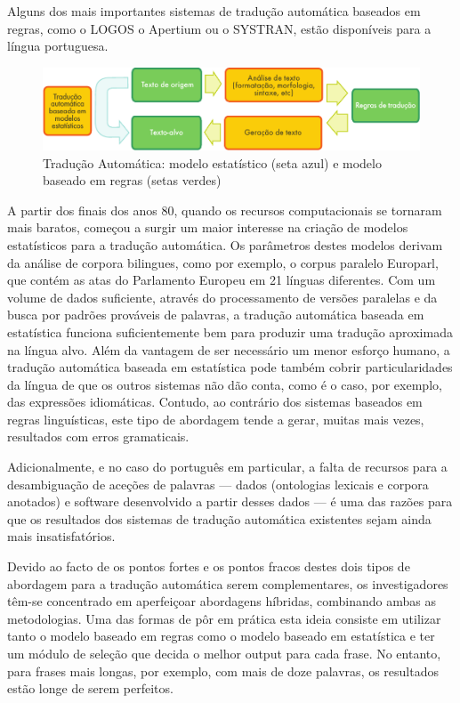 \begin{multicols}{2}
Alguns dos mais importantes sistemas de tradução automática baseados em regras, como o LOGOS o Apertium ou o SYSTRAN, estão disponíveis para a língua portuguesa.

\begin{figure}[htb]
  \center
  \includegraphics[width=\textwidth]{../_media/portuguese/machine_translation}
  \caption{Tradução Automática: modelo estatístico (seta azul) e modelo baseado em regras (setas verdes)}
  \label{fig:mtarch_de}
\end{figure}

A partir dos finais dos anos 80, quando os recursos computacionais se tornaram mais baratos, 
começou a surgir um maior interesse na criação de modelos estatísticos para a tradução automática. 
Os parâmetros destes modelos derivam da análise de corpora bilingues, como por exemplo, o corpus paralelo Europarl, 
que contém as atas do Parlamento Europeu em 21 línguas diferentes. 
Com um volume de dados suficiente, através do processamento de versões paralelas 
e da busca por padrões prováveis de palavras, a tradução automática baseada em estatística funciona suficientemente bem 
para produzir uma tradução aproximada na língua alvo. 
Além da vantagem de ser necessário um menor esforço humano, a tradução automática baseada 
em estatística pode também cobrir particularidades da língua de que os outros sistemas não dão conta, 
como é o caso, por exemplo, das expressões idiomáticas.
Contudo, ao contrário dos sistemas baseados em regras linguísticas, este tipo de abordagem 
tende a gerar, muitas mais vezes, resultados com erros gramaticais.

Adicionalmente, e no caso do português em particular, a falta de recursos 
para a desambiguação de aceções de palavras --- dados (ontologias lexicais e corpora anotados) e software desenvolvido a partir desses dados --- é uma das razões 
para que os resultados dos sistemas de tradução automática existentes 
sejam ainda mais insatisfatórios.

Devido ao facto de os pontos fortes e os pontos fracos destes dois tipos de abordagem para a tradução automática serem complementares, 
os investigadores têm-se concentrado em aperfeiçoar abordagens híbridas, combinando ambas as metodologias. 
Uma das formas de pôr em prática esta ideia consiste em utilizar tanto o modelo baseado em regras como o modelo baseado em estatística e 
ter um módulo de seleção que decida o melhor output para cada frase. 
No entanto, para frases mais longas, por exemplo, com mais de doze palavras, os resultados estão longe de serem perfeitos.  


\end{multicols}
